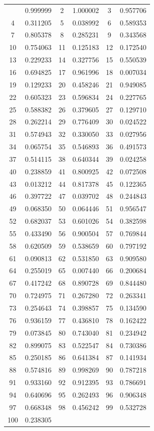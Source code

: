 \documentclass[12pt]{article}
\begin{document}
\begin{longtable}{@{}cc|cc|cc@{}}
\bottomrule
\endlastfoot
1 & 0.999999 & 2 & 1.000002 & 3 & 0.957706 \\
4 & 0.311205 & 5 & 0.038992 & 6 & 0.589353 \\
7 & 0.805378 & 8 & 0.285231 & 9 & 0.343568 \\
10 & 0.754063 & 11 & 0.125183 & 12 & 0.172540 \\
13 & 0.229233 & 14 & 0.327756 & 15 & 0.550539 \\
16 & 0.694825 & 17 & 0.961996 & 18 & 0.007034 \\
19 & 0.129233 & 20 & 0.458246 & 21 & 0.949085 \\
22 & 0.605323 & 23 & 0.596834 & 24 & 0.227765 \\
25 & 0.588382 & 26 & 0.379605 & 27 & 0.129710 \\
28 & 0.262214 & 29 & 0.776409 & 30 & 0.024522 \\
31 & 0.574943 & 32 & 0.330050 & 33 & 0.027956 \\
34 & 0.065754 & 35 & 0.546893 & 36 & 0.491573 \\
37 & 0.514115 & 38 & 0.640344 & 39 & 0.024258 \\
40 & 0.238859 & 41 & 0.800925 & 42 & 0.072508 \\
43 & 0.013212 & 44 & 0.817378 & 45 & 0.122365 \\
46 & 0.397722 & 47 & 0.039702 & 48 & 0.244843 \\
49 & 0.068350 & 50 & 0.064446 & 51 & 0.956547 \\
52 & 0.682037 & 53 & 0.601026 & 54 & 0.382598 \\
55 & 0.433490 & 56 & 0.900504 & 57 & 0.769844 \\
58 & 0.620509 & 59 & 0.538659 & 60 & 0.797192 \\
61 & 0.090813 & 62 & 0.531850 & 63 & 0.909580 \\
64 & 0.255019 & 65 & 0.007440 & 66 & 0.200684 \\
67 & 0.417242 & 68 & 0.890728 & 69 & 0.844480 \\
70 & 0.724975 & 71 & 0.267280 & 72 & 0.263341 \\
73 & 0.254643 & 74 & 0.398857 & 75 & 0.134590 \\
76 & 0.936159 & 77 & 0.436810 & 78 & 0.162422 \\
79 & 0.073845 & 80 & 0.743040 & 81 & 0.234942 \\
82 & 0.899075 & 83 & 0.522547 & 84 & 0.730386 \\
85 & 0.250185 & 86 & 0.641384 & 87 & 0.141934 \\
88 & 0.574816 & 89 & 0.998269 & 90 & 0.787218 \\
91 & 0.933160 & 92 & 0.912395 & 93 & 0.786691 \\
94 & 0.640696 & 95 & 0.262493 & 96 & 0.906348 \\
97 & 0.668348 & 98 & 0.456242 & 99 & 0.532728 \\
100 & 0.238305 &  &  &  &  \\

\end{longtable}
\end{document}
